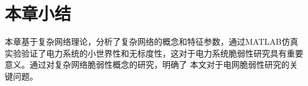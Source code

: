




\section{本章小结}
\label{sec:sum2}
本章基于复杂网络理论，分析了复杂网络的概念和特征参数，通过MATLAB仿真实验验证了电力系统的小世界性和无标度性，这对于电力系统脆弱性研究具有重要意义。通过对复杂网络脆弱性概念的研究，明确了
本文对于电网脆弱性研究的关键问题。




